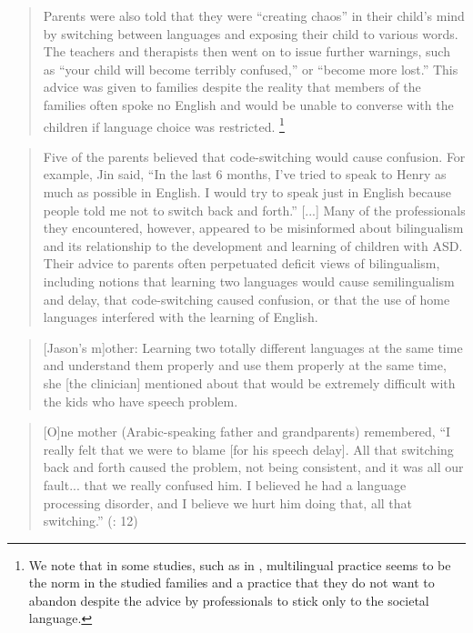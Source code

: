 \documentclass[output=paper]{langscibook}
\begin{document}
\begin{quote}
Parents were also told that they were “creating chaos” in their child’s mind by switching between languages and exposing their child to various words. The teachers and therapists then went on to issue further warnings, such as “your child will become terribly confused,” or “become more lost.” This advice was given to families despite the reality that members of the families often spoke no English and would be unable to converse with the children if language choice was restricted. \citep[195]{Jegatheesan2011}\footnote{We note that in some studies, such as in \citet{Jegatheesan2011}, multilingual practice seems to be the norm in the studied families and a practice that they do not want to abandon despite the advice by professionals to stick only to the societal language.}
\end{quote}

\begin{quote}
Five of the parents believed that code-switching would cause confusion. For example, Jin said, “In the last 6 months, I’ve tried to speak to Henry as much as possible in English. I would try to speak just in English because people told me not to switch back and forth.” [...] Many of the professionals they encountered, however, appeared to be misinformed about bilingualism and its relationship to the development and learning of children with ASD. Their advice to parents often perpetuated deficit views of bilingualism, including notions that learning two languages would cause semilingualism and delay, that code-switching caused confusion, or that the use of home languages interfered with the learning of English. \citep[18-21]{Yu2013}
\end{quote}

\begin{quote}
[Jason's m]other: Learning two totally different languages at the same time and understand them properly and use them properly at the same time, she [the clinician] mentioned about that would be extremely difficult with the kids who have speech problem. \citep[1231]{Kremer-Sadlik2005}
\end{quote}

\begin{quote}
[O]ne mother (Arabic-speaking father and grandparents) remembered, “I really felt that we were to blame [for his speech delay]. All that switching back and forth caused the problem, not being consistent, and it was all our fault... that we really confused him. I believed he had a language processing disorder, and I believe we hurt him doing that, all that switching.”  (\citealt{YGarciaEtAl2012}: 12)
\end{quote}
\end{document}
